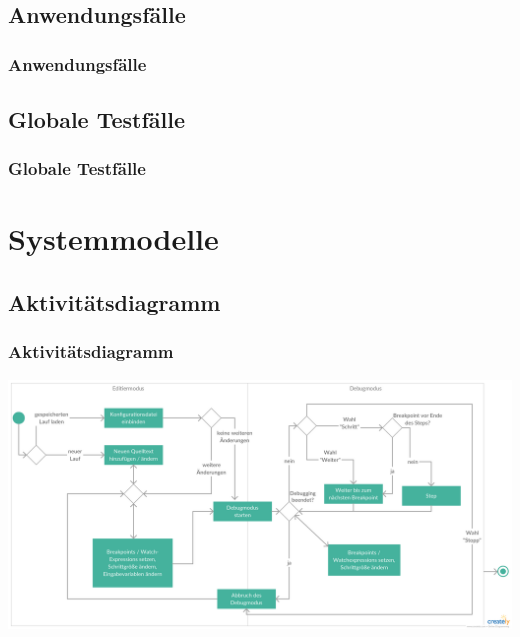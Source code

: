 \documentclass{beamer}
\begin{document}
\subsection{Anwendungsfälle}
\begin{frame}
\frametitle{Anwendungsfälle}
\end{frame}

\subsection{Globale Testfälle}
\begin{frame}
\frametitle{Globale Testfälle}
\end{frame}

\section{Systemmodelle}
\subsection{Aktivitätsdiagramm}
\begin{frame}
\frametitle{Aktivitätsdiagramm}
\includegraphics[scale=0.12]{../Aktivitaetsdiagramm}
\end{frame}

\end{document}
